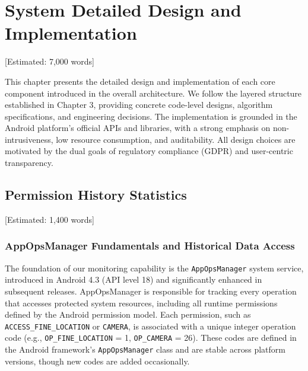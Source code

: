 \newpage\section{System Detailed Design and Implementation} [Estimated: 7,000 words]

This chapter presents the detailed design and implementation of each core component introduced in the overall architecture. We follow the layered structure established in Chapter 3, providing concrete code-level designs, algorithm specifications, and engineering decisions. The implementation is grounded in the Android platform's official APIs and libraries, with a strong emphasis on non-intrusiveness, low resource consumption, and auditability. All design choices are motivated by the dual goals of regulatory compliance (GDPR) and user-centric transparency.

\subsection{Permission History Statistics} [Estimated: 1,400 words]

\subsubsection{AppOpsManager Fundamentals and Historical Data Access}

The foundation of our monitoring capability is the \texttt{AppOpsManager} system service, introduced in Android 4.3 (API level 18) and significantly enhanced in subsequent releases. AppOpsManager is responsible for tracking every operation that accesses protected system resources, including all runtime permissions defined by the Android permission model. Each permission, such as \texttt{ACCESS\_FINE\_LOCATION} or \texttt{CAMERA}, is associated with a unique integer operation code (e.g., \texttt{OP\_FINE\_LOCATION} = 1, \texttt{OP\_CAMERA} = 26). These codes are defined in the Android framework's \texttt{AppOpsManager} class and are stable across platform versions, though new codes are added occasionally.

